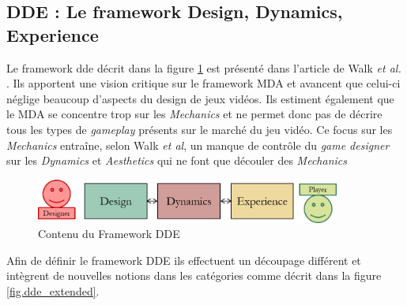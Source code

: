 \subsection{DDE : Le framework Design, Dynamics, Experience \cite{DDE}}

Le framework \gls{dde} décrit dans la figure \ref{fig.dde} est présenté dans l'article de Walk \emph{et al.} \cite{DDE}. Ils apportent une vision critique sur le framework MDA et avancent que celui-ci néglige beaucoup d'aspects du design de jeux vidéos. Ils estiment également que le MDA se concentre trop sur les \emph{Mechanics} et ne permet donc pas de décrire tous les types de \emph{gameplay} présents sur le marché du jeu vidéo. Ce focus sur les \emph{Mechanics} entraîne, selon Walk \emph{et al}, un manque de contrôle du \emph{game designer} sur les \emph{Dynamics} et \emph{Aesthetics} qui ne font que découler des \emph{Mechanics}

\begin{figure}[H]
    \begin{center}
    \includegraphics[width=10cm]{10_img/chap3/dde.png} 
    \caption{Contenu du Framework DDE \cite{DDE}}
    \label{fig.dde}
    \end{center}
\end{figure}

Afin de définir le framework DDE ils effectuent un découpage différent et intègrent de nouvelles notions dans les catégories comme décrit dans la figure \ref{fig.dde_extended}.

